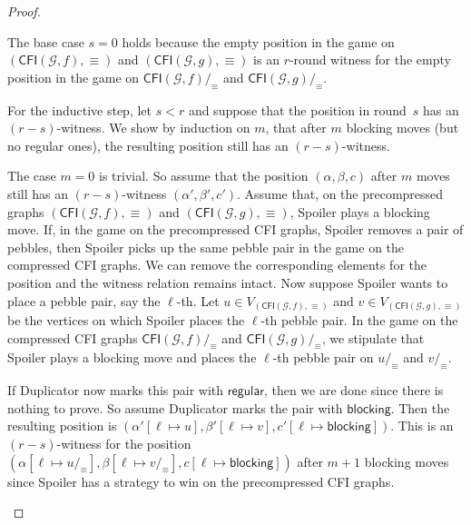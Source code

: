 \documentclass[a4paper,english, thm-restate]{lipics-v2021}
\newcommand{\regular}{\mathsf{regular}}
\newcommand{\blocking}{\mathsf{blocking}}
\newcommand{\comp}{\equiv}
\newcommand{\CFIsym}{\mathsf{CFI}}
\newcommand{\CFI}[1]{\CFIsym(#1)}
\newcommand{\compCFI}[2]{\CFI{#1}/_{#2}}
\newcommand{\precompCFI}[2]{{(\CFI{#1},#2)}}
\newcommand{\graphG}{\mathcal{G}}
\begin{document}
\begin{proof}
\begin{enumerate}
The base case $s=0$ holds because the empty position in the game on $\precompCFI{\graphG,f}{\comp}$ and $\precompCFI{\graphG,g}{\comp}$ is an $r$\nobreakdash-round witness for the empty position in the game on  $\compCFI{\graphG,f}{\comp}$ and $\compCFI{\graphG,g}{\comp}$.
        
        
        For the inductive step, let $s<r$ and suppose that the position in round~$s$ has an ${(r-s)}$\nobreakdash-witness.
        We show by induction on $m$,
        that after $m$ blocking moves (but no regular ones),
        the resulting position still has an $(r-s)$\nobreakdash-witness.

        The case $m=0$ is trivial.
        So assume that the position $(\alpha,\beta,c)$ after $m$ moves
        still has an $(r-s)$-witness $(\alpha',\beta',c')$.
        Assume that, on the precompressed graphs $\precompCFI{\graphG,f}{\comp}$ and $\precompCFI{\graphG,g}{\comp}$, 
        Spoiler plays a blocking move.
        If, in the game on the precompressed CFI graphs, Spoiler removes a pair of pebbles, then Spoiler picks up the same pebble pair
        in the game on the compressed CFI graphs.
        We can remove the corresponding elements for the position and the witness relation remains intact.
        Now suppose Spoiler wants to place a pebble pair,
        say the $\ell$-th.
        Let $u \in V_{\precompCFI{\graphG,f}{\comp}}$ and $v \in V_{\precompCFI{\graphG,g}{\comp}}$ be the vertices on which Spoiler places the $\ell$-th pebble pair.
        In the game on the compressed CFI graphs $\compCFI{\graphG,f}{\comp}$ and $\compCFI{\graphG,g}{\comp}$,
        we stipulate that Spoiler plays a blocking move and
        places the $\ell$-th pebble pair on $u/_\comp$ and $v/_\comp$.

        If Duplicator now marks this pair with $\regular$, then we are done since there is nothing to prove.
        So assume Duplicator marks the pair with $\blocking$. Then the resulting position is $(\alpha'[\ell \mapsto u],\beta'[\ell \mapsto v], c'[\ell\mapsto \blocking])$. This is an $(r-s)$-witness
        for the position $(\alpha[\ell \mapsto u/_\comp],\beta[\ell \mapsto v/_\comp], c[\ell\mapsto \blocking])$ after $m+1$ blocking moves
        since Spoiler has a strategy to win on the precompressed CFI graphs. 
        

\end{enumerate}
\end{proof}
\end{document}

